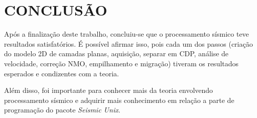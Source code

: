 \chapter{CONCLUSÃO}
\label{cap5}

Após a finalização deste trabalho, concluiu-se que o processamento sísmico teve resultados satisfatórios. É possível afirmar isso, pois cada um dos passos (criação do modelo 2D de camadas planas, aquisição, separar em CDP, análise de velocidade, correção NMO, empilhamento e migração) tiveram os resultados esperados e condizentes com a teoria. 

Além disso, foi importante para conhecer mais da teoria envolvendo  processamento sísmico e adquirir mais conhecimento em relação a parte de programação do pacote \textit{Seismic Unix}.